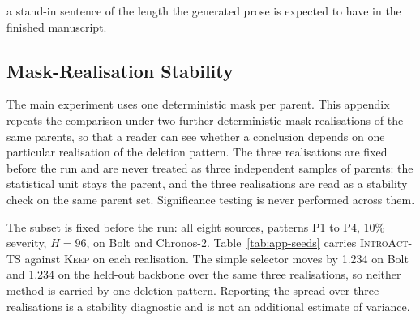 \documentclass{article}
\newcommand{\introact}{\textsc{IntroAct-TS}}
\begin{document}
a stand-in sentence of the length the generated prose is expected to have in the finished manuscript.

\begin{table}[h]
  \caption{Selection stability. Each row is one subsample of the replay bank, with the pair the
  rule selected on it and the evaluation outcome that pair produces. The first row of each
  backbone is the configuration the paper reports.}
  \label{tab:app-selstab}
  \centering
  \small
  \setlength{\tabcolsep}{4pt}
\end{table}

\subsection{Mask-Realisation Stability}
\label{app:seeds}
The main experiment uses one deterministic mask per parent. This appendix repeats the
comparison under two further deterministic mask realisations of the same parents, so that a
reader can see whether a conclusion depends on one particular realisation of the deletion
pattern. The three realisations are fixed before the run and are never treated as three
independent samples of parents: the statistical unit stays the parent, and the three
realisations are read as a stability check on the same parent set. Significance testing is
never performed across them.

The subset is fixed before the run: all eight sources, patterns P1 to P4, $10\%$ severity,
$H=96$, on Bolt and Chronos-2. Table~\ref{tab:app-seeds} carries \introact{} against
\textsc{Keep} on each realisation. The simple selector moves by 1.234 on
Bolt and 1.234 on the held-out backbone over the same three realisations,
so neither method is carried by one deletion pattern. Reporting the spread over three
realisations is a stability diagnostic and is not an additional estimate of variance.
\end{document}
